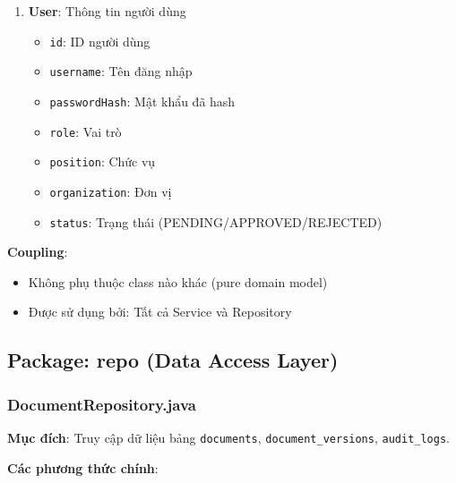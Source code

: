 \documentclass[12pt,a4paper]{article}
\begin{document}
\begin{enumerate}
    \item \textbf{User}: Thông tin người dùng
    \begin{itemize}
        \item \texttt{id}: ID người dùng
        \item \texttt{username}: Tên đăng nhập
        \item \texttt{passwordHash}: Mật khẩu đã hash
        \item \texttt{role}: Vai trò
        \item \texttt{position}: Chức vụ
        \item \texttt{organization}: Đơn vị
        \item \texttt{status}: Trạng thái (PENDING/APPROVED/REJECTED)
    \end{itemize}
\end{enumerate}

\textbf{Coupling}: 
\begin{itemize}
    \item Không phụ thuộc class nào khác (pure domain model)
    \item Được sử dụng bởi: Tất cả Service và Repository
\end{itemize}

\subsection{Package: repo (Data Access Layer)}

\subsubsection{DocumentRepository.java}
\textbf{Mục đích}: Truy cập dữ liệu bảng \texttt{documents}, \texttt{document\_versions}, \texttt{audit\_logs}.

\textbf{Các phương thức chính}:
\end{document}
